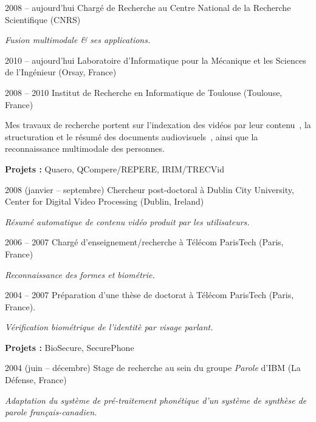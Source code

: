 \documentclass{simplecv}
\begin{document}
\begin{topic}
\item[2008 -- aujourd'hui] Charg\'{e} de Recherche au Centre National de la Recherche Scientifique (CNRS)

\emph{Fusion multimodale \& ses applications.} 

\begin{topic}
	\item[2010 -- aujourd'hui] Laboratoire d'Informatique pour la M\'{e}canique et les Sciences de l'Ing\'{e}nieur (Orsay, France)
	\item[2008 -- 2010] Institut de Recherche en Informatique de Toulouse (Toulouse, France)
\end{topic}

Mes travaux de recherche portent sur l'indexation des vid\'{e}os par leur contenu~\cite{Bredin2012a}, la structuration et le r\'{e}sum\'{e} des documents audiovisuels~\cite{Bredin2012}, ainsi que la reconnaissance multimodale des personnes.

\textbf{Projets :} Quaero, QCompere/REPERE, IRIM/TRECVid

\item[2008 (janvier -- septembre)] Chercheur post-doctoral \`{a} Dublin City University,\\ Center for Digital Video Processing (Dublin, Ireland)

\emph{R\'{e}sum\'{e} automatique de contenu vid\'{e}o produit par les utilisateurs.}

\item[2006 -- 2007] Charg\'{e} d'enseignement/recherche \`{a} T\'{e}l\'{e}com ParisTech (Paris, France)

\emph{Reconnaissance des formes et biom\'{e}trie.}

\item[2004 -- 2007] Pr\'{e}paration d'une th\`{e}se de doctorat \`{a} T\'{e}l\'{e}com ParisTech (Paris, France).

\emph{V\'{e}rification biom\'{e}trique de l'identit\`{e} par visage parlant.}

\textbf{Projets :} BioSecure, SecurePhone 

\item[2004 (juin -- d\'{e}cembre)] Stage de recherche au sein du groupe \emph{Parole} d'IBM (La D\'{e}fense, France)

\emph{Adaptation du syst\`{e}me de pr\'{e}-traitement phon\'{e}tique d'un syst\`{e}me de synth\`{e}se de parole fran\c{c}ais-canadien.}
\end{topic}
\end{document}
